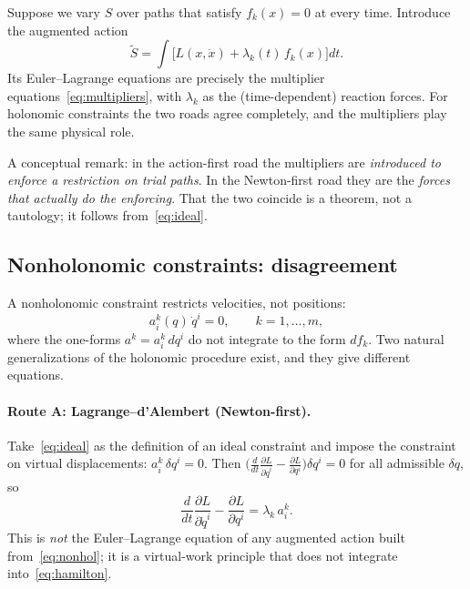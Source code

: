 Suppose we vary $S$ over paths that satisfy $f_k(x)=0$ at every time.
Introduce the augmented action
\begin{equation}
  \tilde S=\int\bigl[L(x,\dot x)+\lambda_k(t)\,f_k(x)\bigr]dt .
  \label{eq:aug-holonomic}
\end{equation}
Its Euler--Lagrange equations are precisely the multiplier
equations~\eqref{eq:multipliers}, with $\lambda_k$ as the (time-dependent)
reaction forces. For holonomic constraints the two roads agree completely, and
the multipliers play the same physical role.

A conceptual remark: in the action-first road the multipliers are
\emph{introduced to enforce a restriction on trial paths}. In the Newton-first
road they are the \emph{forces that actually do the enforcing}. That the two
coincide is a theorem, not a tautology; it follows from~\eqref{eq:ideal}.

\subsection{Nonholonomic constraints: disagreement}
\label{sec:nonholonomic}

A nonholonomic constraint restricts velocities, not positions:
\begin{equation}
  a^k_i(q)\,\dot q^i=0,\qquad k=1,\dots,m,
  \label{eq:nonhol}
\end{equation}
where the one-forms $a^k=a^k_i\,dq^i$ do not integrate to the form $df_k$.
Two natural generalizations of the holonomic procedure exist, and they give
different equations.

\paragraph{Route A: Lagrange--d'Alembert (Newton-first).}
Take~\eqref{eq:ideal} as the definition of an ideal constraint and impose the
constraint on virtual displacements:
$a^k_i\,\delta q^i=0$. Then
$\bigl(\frac{d}{dt}\frac{\partial L}{\partial\dot q^i}-\frac{\partial L}{\partial q^i}\bigr)\delta q^i=0$
for all admissible $\delta q$, so
\begin{equation}
  \frac{d}{dt}\frac{\partial L}{\partial\dot q^i}-\frac{\partial L}{\partial q^i}
  =\lambda_k\,a^k_i .
  \label{eq:LdA}
\end{equation}
This is \emph{not} the Euler--Lagrange equation of any augmented action built
from~\eqref{eq:nonhol}; it is a virtual-work principle that does not
integrate into~\eqref{eq:hamilton}.

